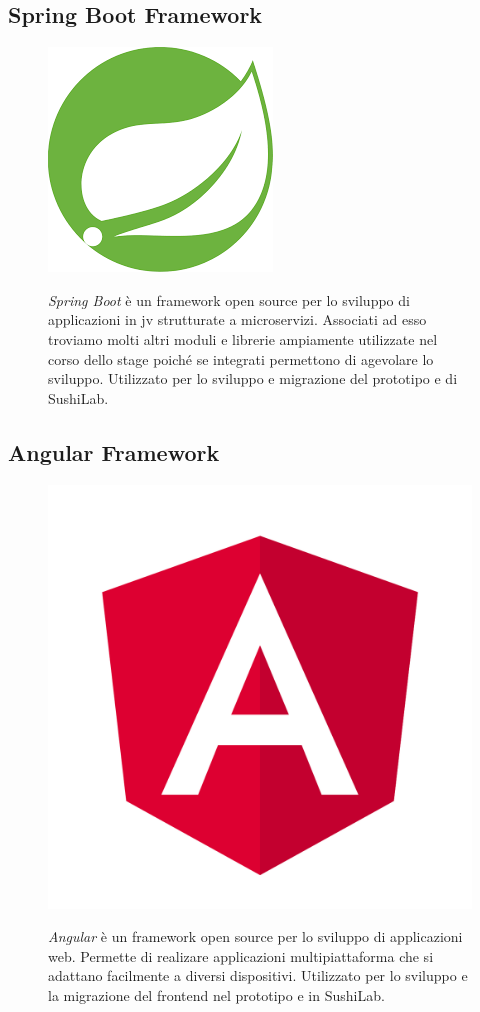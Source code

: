 \subsection*{Spring Boot Framework}
\FloatBarrier
\begin{figure}[!h]
  \begin{minipage}[h]{0.3\linewidth}
    \centering
    \includegraphics[width=0.4\linewidth]{immagini/spring.png}
  \end{minipage}
  \begin{minipage}[!h]{0.7\linewidth}
    \textit{Spring Boot} è un framework open source per lo sviluppo di applicazioni in \gls{jv} strutturate a microservizi. Associati ad esso troviamo molti altri moduli e librerie ampiamente utilizzate nel corso dello stage poiché se integrati permettono di agevolare lo sviluppo. Utilizzato per lo sviluppo e migrazione del prototipo e di SushiLab.
  \end{minipage}
\end{figure}
\FloatBarrier
\subsection*{Angular Framework}
\FloatBarrier
\begin{figure}[!h]
  \begin{minipage}[h]{0.3\linewidth}
    \centering
    \includegraphics[width=0.5\linewidth]{immagini/angular.png}
  \end{minipage}
  \begin{minipage}[!h]{0.7\linewidth}
    \textit{Angular} è un framework open source per lo sviluppo di applicazioni web. Permette di realizare applicazioni multipiattaforma che si adattano facilmente a diversi dispositivi. Utilizzato per lo sviluppo e la migrazione del frontend nel prototipo e in SushiLab.
  \end{minipage}
\end{figure}
\FloatBarrier
